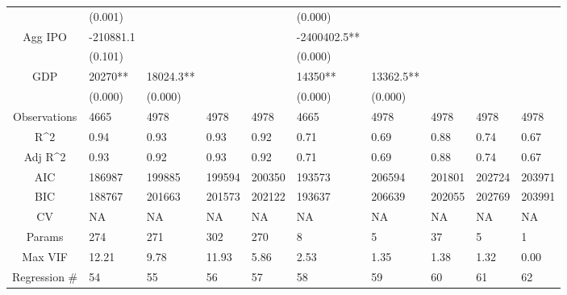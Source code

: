 \documentclass{article}
\begin{document}
\begin{table}[H]
\begin{tabular}{|clllllllll|}
   & (0.001) &  &  &  & (0.000) &  &  &  &  \\ 
  Agg IPO & -210881.1 &  &  &  & -2400402.5** &  &  &  &  \\ 
   & (0.101) &  &  &  & (0.000) &  &  &  &  \\ 
  GDP & 20270** & 18024.3** &  &  & 14350** & 13362.5** &  &  &  \\ 
   & (0.000) & (0.000) &  &  & (0.000) & (0.000) &  &  &  \\ 
  \hline 
 Observations & 4665 & 4978 & 4978 & 4978 & 4665 & 4978 & 4978 & 4978 & 4978 \\ 
  R^2 & 0.94 & 0.93 & 0.93 & 0.92 & 0.71 & 0.69 & 0.88 & 0.74 & 0.67 \\ 
  Adj R^2 & 0.93 & 0.92 & 0.93 & 0.92 & 0.71 & 0.69 & 0.88 & 0.74 & 0.67 \\ 
  AIC & 186987 & 199885 & 199594 & 200350 & 193573 & 206594 & 201801 & 202724 & 203971 \\ 
  BIC & 188767 & 201663 & 201573 & 202122 & 193637 & 206639 & 202055 & 202769 & 203991 \\ 
  CV & NA & NA & NA & NA & NA & NA & NA & NA & NA \\ 
  Params & 274 & 271 & 302 & 270 & 8 & 5 & 37 & 5 & 1 \\ 
  Max VIF & 12.21 & 9.78 & 11.93 & 5.86 & 2.53 & 1.35 & 1.38 & 1.32 & 0.00 \\ 
  Regression \# & 54 & 55 & 56 & 57 & 58 & 59 & 60 & 61 & 62 \\ 
   \hline
\end{tabular}
 
\end{table}
\end{document}
